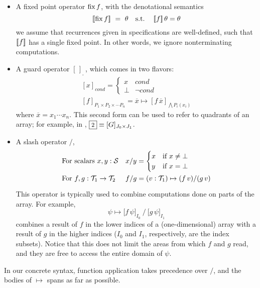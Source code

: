 \begin{itemize}
  \item A fixed point operator $\operatorname{fix} f$, with the denotational semantics
    \[[\![{\operatorname{fix} f}]\!] ~=~ \theta \textrm{ ~ s.t. ~ } [\![{f}]\!]\,\theta=\theta\]
  we assume that recurrences given in specifications are well-defined, 
  such that $[\![{f}]\!]$ has a single fixed point.
  In other words, we ignore nonterminating computations.
  \item A guard operator $[\,]_{_\square}\,$, which comes in two flavors:
  \[\begin{array}{l}
      [x]_{\mathit{cond}} = \begin{cases}x & \mathit{cond} \\ \bot & \lnot\mathit{cond}\end{cases} \\
      {}[f]_{P_1\times P_2\times \cdots P_n} = \overline{x} \mapsto [f\,\overline{x}]_{\bigwedge P_i(x_i)}
    \end{array}\]
  where $\overline{x} = x_1 \cdots x_n$. This second form can be used to
  refer to quadrants of an array; for example, in , $\qbox2 \equiv [G]_{J_0\times J_1}$.
  \item A slash operator $/$,     \vspace{-2pt}
  \[\renewcommand\arraystretch{1.5}
    \begin{array}{ll}
      \mbox{For scalars $x,y:\S$} & x/y = \begin{cases}x & \mbox{if }x\neq\bot \\ y & \mbox{if }x=\bot\end{cases} \\
      \mbox{For $f,g:\T_1\to\T_2$} & f/g = (v:\T_1)\mapsto (f\,v)/(g\,v)
    \end{array}\]
  This operator is typically used to combine computations done on
  parts of the array. For example, \[\psi\mapsto \big[f\,\psi\big]_{I_0} ~ \Big/ ~ \big[g\,\psi\big]_{I_1}\]
  combines a result of $f$ in the lower indices of a (one-dimensional) array
  with a result of $g$ in the higher indices ($I_0$ and $I_1$, respectively, are the index subsets).
  Notice that this does not limit the areas from which $f$ and $g$ read,
  and they are free to access the entire domain of $\psi$.
\end{itemize}

In our concrete syntax, function application takes precedence over $/$,
and the bodies of $\mapsto$ spans as far as possible.

